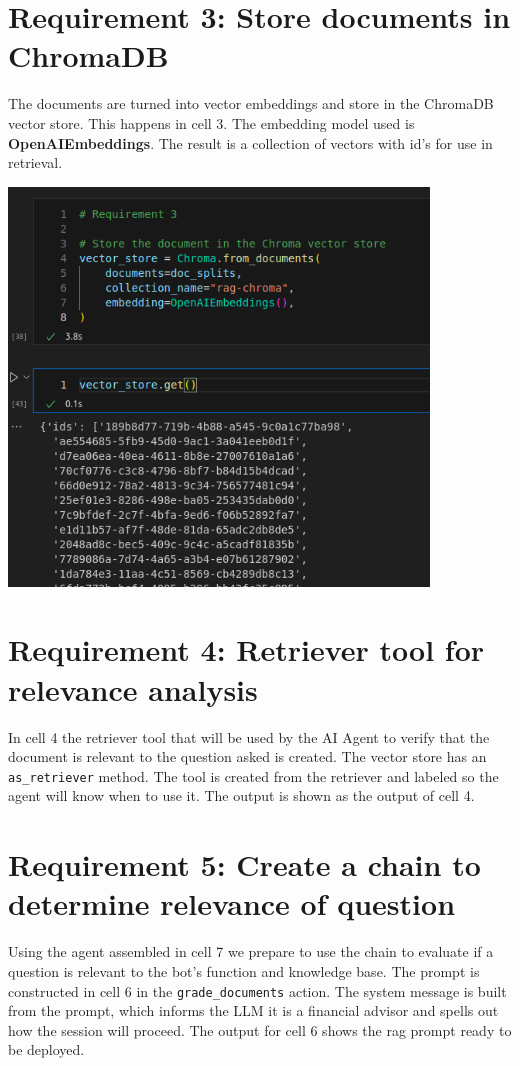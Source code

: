 \documentclass[11pt,letterpaper]{article}
\begin{document}
\section*{Requirement 3: Store documents in ChromaDB}
\tab The documents are turned into vector embeddings and store in the ChromaDB vector store. This happens in cell 3. 
The embedding model used is \textbf{OpenAIEmbeddings}. The result is a collection of vectors with id's for use in retrieval.

\begin{center}
    \includegraphics[height=300pt]{req_3.png}
\end{center}

\section*{Requirement 4: Retriever tool for relevance analysis}
\tab In cell 4 the retriever tool that will be used by the AI Agent to verify that the document is relevant to the question asked is created.
The vector store has an \texttt{as\_retriever} method. The tool is created from the retriever and labeled so the agent will know when to use it.
The output is shown as the output of cell 4.

\section*{Requirement 5: Create a chain to determine relevance of question}
\tab Using the agent assembled in cell 7 we prepare to use the chain to evaluate if a question is relevant to the bot's function and knowledge base.
The prompt is constructed in cell 6 in the \texttt{grade\_documents} action. The system message is built from the prompt, which informs the 
LLM it is a financial advisor and spells out how the session will proceed. The output for cell 6 shows the rag prompt ready to be deployed.
\end{document}
